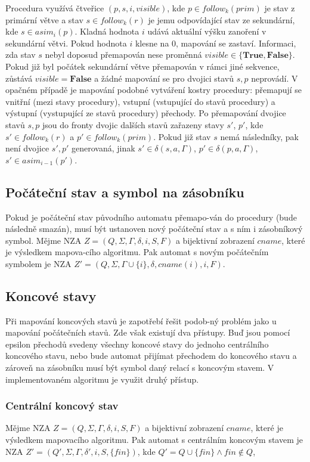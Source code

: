         Procedura využívá čtveřice $(p, s, i, visible)$, kde $p \in follow_k(prim)$ je stav z primární větve a stav $s \in follow_k(r)$ je jemu odpovídající stav ze sekundární, kde $s \in asim_i(p)$. Kladná hodnota $i$ udává aktuální výšku zanoření v sekundární větvi. Pokud hodnota $i$ klesne na $0$, mapování se zastaví. Informaci, zda stav $s$ nebyl doposud přemapován nese proměnná $visible \in \{\textbf{True}, \textbf{False}\}$. Pokud již byl počátek sekundární větve přemapován v rámci jiné sekvence, zůstává $visible = \textbf{False}$ a žádné mapování se pro dvojici stavů $s, p$ neprovádí. V opačném případě je mapování podobné vytváření kostry procedury: přemapují se vnitřní (mezi stavy procedury), vstupní (vstupující do stavů procedury) a výstupní (vystupující ze stavů procedury) přechody. Po přemapování dvojice stavů $s, p$ jsou do fronty dvojic dalších stavů zařazeny stavy $s'$, $p'$, kde $s' \in follow_k(r)$ a $p' \in follow_k(prim)$. Pokud již stav $s$ nemá následníky, pak není dvojice $s', p'$ generovaná, jinak $s' \in \delta(s, a, \Gamma)$, $p' \in \delta(p, a, \Gamma)$, $s' \in asim_{i-1}(p')$.

    \subsection{Počáteční stav a symbol na zásobníku}
        Pokud je počáteční stav původního automatu přemapo-ván do procedury (bude následně smazán), musí být ustanoven nový počáteční stav a s ním i zásobníkový symbol. Mějme NZA $Z = (Q, \Sigma, \Gamma, \delta, i, S, F)$ a bijektivní zobrazení $cname$, které je výsledkem mapova-cího algoritmu. Pak automat s novým počátečním symbolem je NZA $Z' = (Q, \Sigma, \Gamma \cup \{i\}, \delta, cname(i), i, F)$.

    \subsection{Koncové stavy}
        Při mapování koncových stavů je zapotřebí řešit podob-ný problém jako u mapování počátečních stavů. Zde však existují dva přístupy. Buď jsou pomocí epsilon přechodů svedeny všechny koncové stavy do jednoho centrálního koncového stavu, nebo bude automat přijímat přechodem do koncového stavu a zároveň na zásobníku musí být symbol daný relací s koncovým stavem. V implementovaném algoritmu je využit druhý přístup.

        \subsubsection*{Centrální koncový stav}
            Mějme NZA $Z = (Q, \Sigma, \Gamma, \delta, i, S, F)$ a bijektivní zobrazení $cname$, které je výsledkem mapovacího algoritmu. Pak automat s centrálním koncovým stavem je NZA $Z' = (Q', \Sigma, \Gamma, \delta', i, S, \{fin\})$, kde $Q' = Q \cup \{fin\} \land fin \notin Q$,

